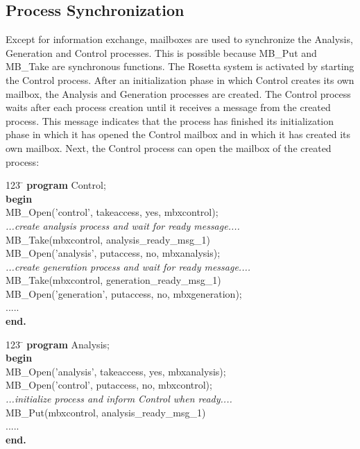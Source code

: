 \subsection{Process Synchronization}
Except for information exchange, mailboxes are used to synchronize the 
Analysis, Generation and Control processes. This is possible because MB\_Put and
MB\_Take are synchronous functions. The Rosetta system is activated by starting
the Control process. After an initialization phase in which Control creates its
own mailbox, the Analysis and Generation processes are created. The Control 
process waits after each process creation until it receives a message from the
created process. This message indicates that the process has finished its 
initialization phase in which it has opened the Control mailbox and in which
it has created its own mailbox. Next, the Control process can open the mailbox
of the created process: \\
\begin{tabbing}
123 \= \kill
{\bf program} Control; \\
{\bf begin} \\
\> MB\_Open('control', takeaccess, yes, mbxcontrol); \\
\> {\em ...create analysis process and wait for ready message....} \\
\> MB\_Take(mbxcontrol, analysis\_ready\_msg\_1) \\
\> MB\_Open('analysis', putaccess, no, mbxanalysis); \\
\> {\em ...create generation process and wait for ready message....} \\
\> MB\_Take(mbxcontrol, generation\_ready\_msg\_1) \\
\> MB\_Open('generation', putaccess, no, mbxgeneration); \\
\> ..... \\
{\bf end.}
\end{tabbing}
\begin{tabbing}
123 \= \kill
{\bf program} Analysis; \\
{\bf begin} \\
\> MB\_Open('analysis', takeaccess, yes, mbxanalysis); \\
\> MB\_Open('control', putaccess, no, mbxcontrol); \\
\> {\em ...initialize process and inform Control when ready....} \\
\> MB\_Put(mbxcontrol, analysis\_ready\_msg\_1) \\
\> ..... \\
{\bf end.}
\end{tabbing}
